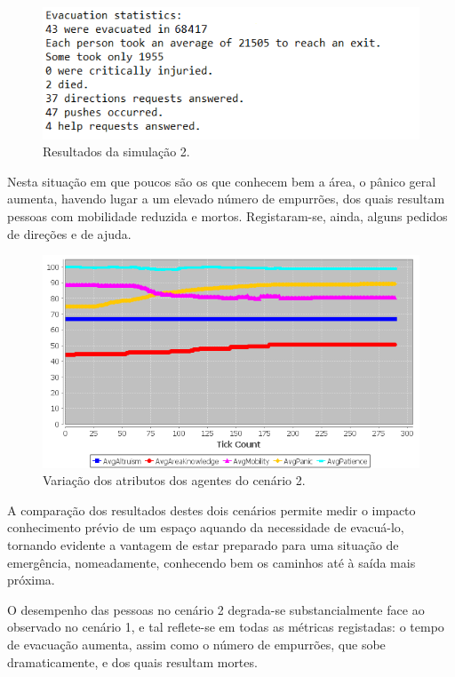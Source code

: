 \documentclass[12pt]{article}
\begin{document}
\begin{titlepage}
\begin{itemize}
\begin{figure}[H]
	\centering
	\includegraphics{log_sc2.png}
	\caption{Resultados da simulação 2.}
	\label{log_sc1}
\end{figure}

Nesta situação em que poucos são os que conhecem bem a área, o pânico geral aumenta, havendo lugar a um elevado número de empurrões, dos quais resultam pessoas com mobilidade reduzida e mortos. Registaram-se, ainda, alguns pedidos de direções e de ajuda.

\begin{figure}[H]
	\centering
	\includegraphics{graph_sc2.png}
	\caption{Variação dos atributos dos agentes do cenário 2.}
	\label{graph_sc1}
\end{figure}

A comparação dos resultados destes dois cenários permite medir o impacto conhecimento prévio de um espaço aquando da necessidade de evacuá-lo, tornando evidente a vantagem de estar preparado para uma situação de emergência, nomeadamente, conhecendo bem os caminhos até à saída mais próxima.

O desempenho das pessoas no cenário 2 degrada-se substancialmente face ao observado no cenário 1, e tal reflete-se em todas as métricas registadas: o tempo de evacuação aumenta, assim como o número de empurrões, que sobe dramaticamente, e dos quais resultam mortes.



\end{itemize}
\end{titlepage}
\end{document}
